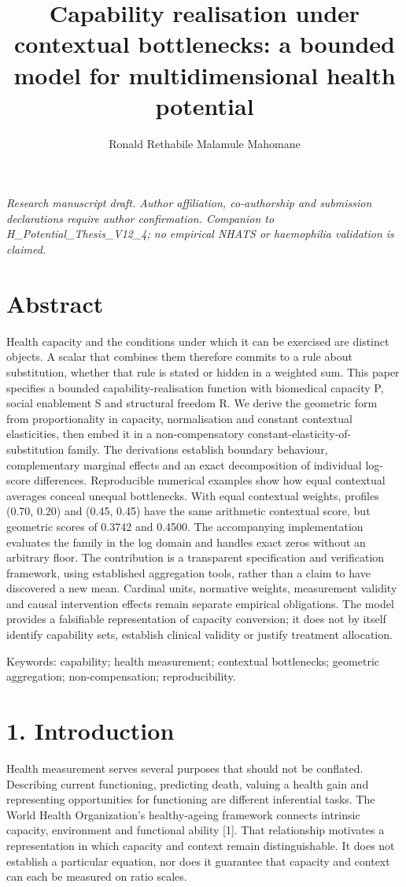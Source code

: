 \documentclass[11pt,a4paper]{article}
\title{Capability realisation under contextual bottlenecks: a bounded model for multidimensional health potential}
\author{Ronald Rethabile Malamule Mahomane}
\date{}
\begin{document}
\maketitle
\begin{center}\small\itshape Research manuscript draft. Author affiliation, co-authorship and submission declarations require author confirmation. Companion to H\_Potential\_Thesis\_V12\_4; no empirical NHATS or haemophilia validation is claimed.\end{center}

\section*{Abstract}
Health capacity and the conditions under which it can be exercised are distinct objects. A scalar that combines them therefore commits to a rule about substitution, whether that rule is stated or hidden in a weighted sum. This paper specifies a bounded capability-realisation function with biomedical capacity P, social enablement S and structural freedom R. We derive the geometric form from proportionality in capacity, normalisation and constant contextual elasticities, then embed it in a non-compensatory constant-elasticity-of-substitution family. The derivations establish boundary behaviour, complementary marginal effects and an exact decomposition of individual log-score differences. Reproducible numerical examples show how equal contextual averages conceal unequal bottlenecks. With equal contextual weights, profiles (0.70, 0.20) and (0.45, 0.45) have the same arithmetic contextual score, but geometric scores of 0.3742 and 0.4500. The accompanying implementation evaluates the family in the log domain and handles exact zeros without an arbitrary floor. The contribution is a transparent specification and verification framework, using established aggregation tools, rather than a claim to have discovered a new mean. Cardinal units, normative weights, measurement validity and causal intervention effects remain separate empirical obligations. The model provides a falsifiable representation of capacity conversion; it does not by itself identify capability sets, establish clinical validity or justify treatment allocation.

Keywords: capability; health measurement; contextual bottlenecks; geometric aggregation; non-compensation; reproducibility.

\section*{1. Introduction}
Health measurement serves several purposes that should not be conflated. Describing current functioning, predicting death, valuing a health gain and representing opportunities for functioning are different inferential tasks. The World Health Organization's healthy-ageing framework connects intrinsic capacity, environment and functional ability [1]. That relationship motivates a representation in which capacity and context remain distinguishable. It does not establish a particular equation, nor does it guarantee that capacity and context can each be measured on ratio scales.
\end{document}
